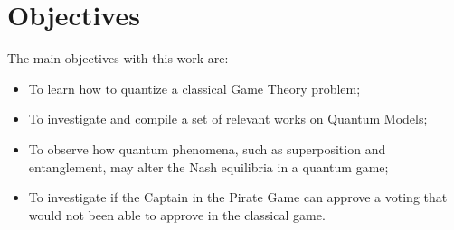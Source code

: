 \section{Objectives}
\label{sec:int_objectives}

The main objectives with this work are: 

\begin{itemize}
\item To learn how to quantize a classical Game Theory problem;

\item To investigate and compile a set of relevant works on Quantum Models;

\item To observe how quantum phenomena, such as superposition and entanglement, may alter the Nash equilibria in a quantum game;

\item To investigate if the Captain in the Pirate Game can approve a voting that would not been able to approve in the classical game. 

\end{itemize}